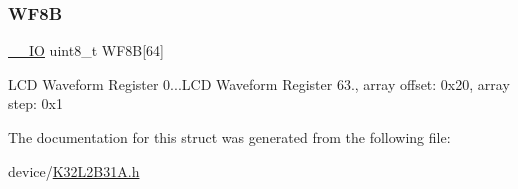 \subsubsection{\texorpdfstring{WF8B}{WF8B}}
{\footnotesize\ttfamily \mbox{\hyperlink{core__cm0plus_8h_aec43007d9998a0a0e01faede4133d6be}{\+\_\+\+\_\+\+IO}} uint8\+\_\+t W\+F8B\mbox{[}64\mbox{]}}

L\+CD Waveform Register 0...L\+CD Waveform Register 63., array offset\+: 0x20, array step\+: 0x1 

The documentation for this struct was generated from the following file\+:\begin{DoxyCompactItemize}
\item 
device/\mbox{\hyperlink{_k32_l2_b31_a_8h}{K32\+L2\+B31\+A.\+h}}\end{DoxyCompactItemize}
